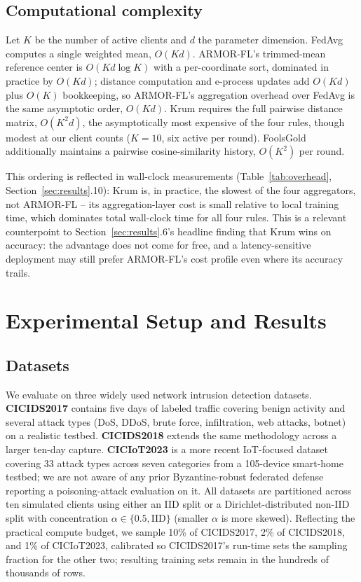 \documentclass[pdflatex,iicol,sn-mathphys-num]{sn-jnl}%
\theoremstyle{thmstyleone}%
\theoremstyle{thmstyletwo}%
\theoremstyle{thmstylethree}%
\begin{document}
\subsection{Computational complexity}\label{sec:complexity}

Let $K$ be the number of active clients and $d$ the parameter dimension. FedAvg computes a single weighted mean, $O(Kd)$. ARMOR-FL's trimmed-mean reference center is $O(Kd \log K)$ with a per-coordinate sort, dominated in practice by $O(Kd)$; distance computation and e-process updates add $O(Kd)$ plus $O(K)$ bookkeeping, so ARMOR-FL's aggregation overhead over FedAvg is the same asymptotic order, $O(Kd)$. Krum requires the full pairwise distance matrix, $O(K^2d)$, the asymptotically most expensive of the four rules, though modest at our client counts ($K=10$, six active per round). FoolsGold additionally maintains a pairwise cosine-similarity history, $O(K^2)$ per round.

This ordering is reflected in wall-clock measurements (Table~\ref{tab:overhead}, Section~\ref{sec:results}.10): Krum is, in practice, the slowest of the four aggregators, not ARMOR-FL -- its aggregation-layer cost is small relative to local training time, which dominates total wall-clock time for all four rules. This is a relevant counterpoint to Section~\ref{sec:results}.6's headline finding that Krum wins on accuracy: the advantage does not come for free, and a latency-sensitive deployment may still prefer ARMOR-FL's cost profile even where its accuracy trails.

\section{Experimental Setup and Results}\label{sec:setup}\label{sec:results}

\subsection{Datasets}

We evaluate on three widely used network intrusion detection datasets. \textbf{CICIDS2017} \citep{sharafaldin2018cicids} contains five days of labeled traffic covering benign activity and several attack types (DoS, DDoS, brute force, infiltration, web attacks, botnet) on a realistic testbed. \textbf{CICIDS2018} extends the same methodology across a larger ten-day capture. \textbf{CICIoT2023} \citep{neto2023ciciot2023} is a more recent IoT-focused dataset covering 33 attack types across seven categories from a 105-device smart-home testbed; we are not aware of any prior Byzantine-robust federated defense reporting a poisoning-attack evaluation on it. All datasets are partitioned across ten simulated clients using either an IID split or a Dirichlet-distributed non-IID split with concentration $\alpha \in \{0.5, \mathrm{IID}\}$ (smaller $\alpha$ is more skewed). Reflecting the practical compute budget, we sample 10\% of CICIDS2017, 2\% of CICIDS2018, and 1\% of CICIoT2023, calibrated so CICIDS2017's run-time sets the sampling fraction for the other two; resulting training sets remain in the hundreds of thousands of rows.
\end{document}

